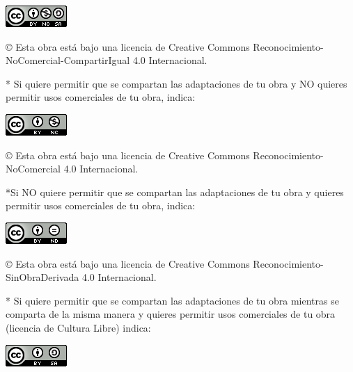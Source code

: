\documentclass[spanish,a4paper,12pt,oneside]{scrbook}
\begin{document}
\begin{center}
\includegraphics[scale=1.8]{images/by-nc-sa_88x31}\\[5mm]
\end{center}

\begin{large}
© Esta obra está bajo una licencia de Creative Commons Reconocimiento-NoComercial-CompartirIgual 4.0 Internacional.
\end{large}

\bigskip
\bigskip
\bigskip
* Si quiere permitir que se compartan las adaptaciones de tu obra y NO quieres permitir usos comerciales de tu obra, indica:

\begin{center}
\includegraphics[scale=1.8]{images/by-nc_88x31}\\[5mm]
\end{center}

\begin{large}
© Esta obra está bajo una licencia de Creative Commons Reconocimiento-NoComercial 4.0 Internacional.
\end{large}

\bigskip
\bigskip
\bigskip
*Si NO quiere permitir que se compartan las adaptaciones de tu obra y quieres permitir usos comerciales de tu obra, indica:

\begin{center}
\includegraphics[scale=1.8]{images/by-nd_88x31}\\[5mm]
\end{center}

\begin{large}
© Esta obra está bajo una licencia de Creative Commons Reconocimiento-SinObraDerivada 4.0 Internacional.
\end{large}

\bigskip
\bigskip
\bigskip
* Si quiere permitir que se compartan las adaptaciones de tu obra mientras se comparta de la misma manera y quieres permitir usos comerciales de tu obra (licencia de Cultura Libre) indica:

\begin{center}
\includegraphics[scale=1.8]{images/by-sa_88x31}\\[5mm]
\end{center}
\end{document}

